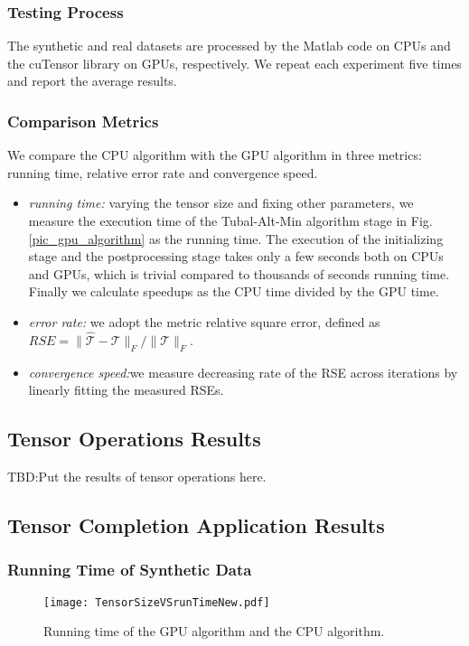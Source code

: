 \documentclass[format=acmsmall, review=false, screen=true]{acmart}
\begin{document}
\subsubsection{Testing Process}
The synthetic and real datasets are processed by the Matlab code on CPUs and the cuTensor library on GPUs, respectively. We repeat each experiment five times and report the average results.



\subsubsection{Comparison Metrics}
We compare the CPU algorithm with the GPU algorithm in three metrics: running time, relative error rate and convergence speed.
\begin{itemize}
  \item \textit{running time:} varying the tensor size and fixing other parameters, we measure the execution time of the Tubal-Alt-Min algorithm stage in Fig. \ref{pic_gpu_algorithm} as the running time. The execution of the initializing stage and the postprocessing stage takes only a few seconds both on CPUs and GPUs, which is trivial compared to thousands of seconds running time. Finally we calculate speedups as the CPU time divided by the GPU time.
  \item \textit{error rate:} we adopt the metric relative square
      error, defined as $ RSE = \| \widehat{\mathcal{T}} - \mathcal{T} \|_F / \|\mathcal{T} \|_F $.
  \item \textit{convergence speed:}we measure decreasing rate of the RSE across iterations by linearly fitting the measured RSEs.
\end{itemize}

\subsection{Tensor Operations Results}
TBD:Put the results of tensor operations here.

\subsection{Tensor Completion Application Results}
\subsubsection{Running Time of Synthetic Data}
\begin{figure}[t]
    \centering
    \texttt{[image: TensorSizeVSrunTimeNew.pdf]}
    \caption{Running time of the GPU algorithm and the CPU algorithm.}
    \label{pic_runningtime}
\end{figure}
\end{document}
